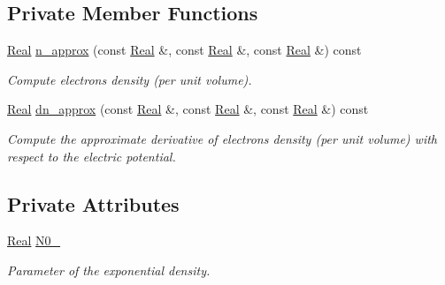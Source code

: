 \subsection*{Private Member Functions}
\begin{DoxyCompactItemize}
\item 
\hyperlink{typedefs_8h_a060b837c3b4486ee35317744156f3da2}{Real} \hyperlink{classExponentialCharge_a91f27044b2f7ced7c2330153bb9da652}{n\-\_\-approx} (const \hyperlink{typedefs_8h_a060b837c3b4486ee35317744156f3da2}{Real} \&, const \hyperlink{typedefs_8h_a060b837c3b4486ee35317744156f3da2}{Real} \&, const \hyperlink{typedefs_8h_a060b837c3b4486ee35317744156f3da2}{Real} \&) const 
\begin{DoxyCompactList}\small\item\em Compute electrons density (per unit volume). \end{DoxyCompactList}\item 
\hyperlink{typedefs_8h_a060b837c3b4486ee35317744156f3da2}{Real} \hyperlink{classExponentialCharge_ab5ce245792f1b0d7c2038ebc75bbc758}{dn\-\_\-approx} (const \hyperlink{typedefs_8h_a060b837c3b4486ee35317744156f3da2}{Real} \&, const \hyperlink{typedefs_8h_a060b837c3b4486ee35317744156f3da2}{Real} \&, const \hyperlink{typedefs_8h_a060b837c3b4486ee35317744156f3da2}{Real} \&) const 
\begin{DoxyCompactList}\small\item\em Compute the approximate derivative of electrons density (per unit volume) with respect to the electric potential. \end{DoxyCompactList}\end{DoxyCompactItemize}
\subsection*{Private Attributes}
\begin{DoxyCompactItemize}
\item 
\hypertarget{classExponentialCharge_aa51672586248c54289ad6ac1a5d3c274}{\hyperlink{typedefs_8h_a060b837c3b4486ee35317744156f3da2}{Real} \hyperlink{classExponentialCharge_aa51672586248c54289ad6ac1a5d3c274}{N0\-\_\-}}\label{classExponentialCharge_aa51672586248c54289ad6ac1a5d3c274}

\begin{DoxyCompactList}\small\item\em Parameter of the exponential density. \end{DoxyCompactList}\end{DoxyCompactItemize}
